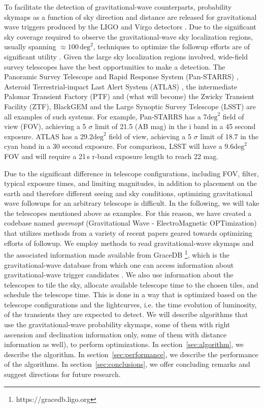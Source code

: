 \documentclass[twocolumn]{aastex62}
\begin{document}
To facilitate the detection of gravitational-wave counterparts, probability skymaps as a function of sky direction and distance are released for gravitational wave triggers produced by the LIGO and Virgo detectors \citep{SiPr2014,BeMa2015,Si2016}. 
Due to the significant sky coverage required to observe the gravitational-wave sky localization regions, usually spanning $\approx 100\,\textrm{deg}^2$, techniques to optimize the followup efforts are of significant utility \citep{Fair2009,Fair2011,Grover:2013,WeCh2010,SiAy2014,SiPr2014,BeMa2015,EsVi2015,CoLi2015,KlVe2016}.
Given the large sky localization regions involved, wide-field survey telescopes have the best opportunities to make a detection. 
The Panoramic Survey Telescope and Rapid Response System (Pan-STARRS) \citep{MoKa2012}, Asteroid Terrestrial-impact Last Alert System (ATLAS) \citep{Ton2011}, the intermediate Palomar Transient Factory (PTF) \citep{RaSh2009} and (what will become) the Zwicky Transient Facility (ZTF), BlackGEM \citep{BlGr2015} and the Large Synoptic Survey Telescope (LSST) \citep{Ivezic2014} are all examples of such systems.
For example, Pan-STARRS has a 7$\textrm{deg}^2$ field of view (FOV), achieving a 5 $\sigma$ limit of 21.5 (AB mag) in the i band in a 45 second exposure. ATLAS has a 29.2$\textrm{deg}^2$ field of view, achieving a 5 $\sigma$ limit of 18.7 in the cyan band in a 30 second exposure. For comparison, LSST will have a $9.6\textrm{deg}^2$ FOV and will require a 21\,s r-band exposure length to reach 22 mag.

Due to the significant difference in telescope configurations, including FOV, filter, typical exposure times, and limiting magnitudes, in addition to placement on the earth and therefore different seeing and sky conditions, optimizing gravitational wave followups for an arbitrary telescope is difficult.
In the following, we will take the telescopes mentioned above as examples.
For this reason, we have created a codebase named \emph{gwemopt} (Gravitational Wave - ElectroMagnetic OPTimization) that utilizes methods from a variety of recent papers geared towards optimizing efforts of followup. We employ methods to read gravitational-wave skymaps and the associated information made available from GraceDB \footnote{https://gracedb.ligo.org}, which is the gravitational-wave database from which one can access information about gravitational-wave trigger candidates \citep{AbEA2016b}.
We also use information about the telescopes to tile the sky, allocate available telescope time to the chosen tiles, and schedule the telescope time. 
This is done in a way that is optimized based on the telescope configurations and the lightcurves, i.e. the time evolution of luminosity, of the transients they are expected to detect.
We will describe algorithms that use the gravitational-wave probability skymaps, some of them with right ascension and declination information only, some of them with distance information as well), to perform optimizations.
In section~\ref{sec:algorithm}, we describe the algorithm.
In section~\ref{sec:performance}, we describe the performance of the algorithms.
In section~\ref{sec:conclusions}, we offer concluding remarks and suggest directions for future research.
\end{document}
